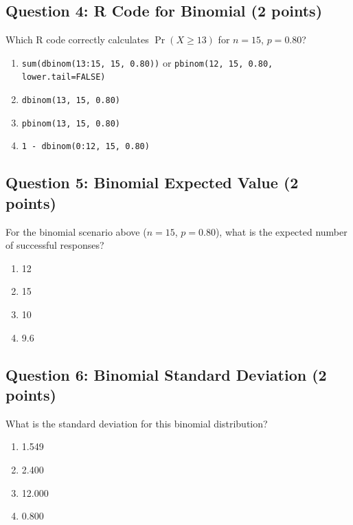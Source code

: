 \documentclass[11pt]{article}
\begin{document}
\vspace{0.5cm}

\subsection*{Question 4: R Code for Binomial (2 points)}

Which R code correctly calculates $\Pr(X \geq 13)$ for $n=15$, $p=0.80$?

\begin{enumerate}[label=\Alph*)]
\item \texttt{sum(dbinom(13:15, 15, 0.80))} or \texttt{pbinom(12, 15, 0.80, lower.tail=FALSE)}
\item \texttt{dbinom(13, 15, 0.80)}
\item \texttt{pbinom(13, 15, 0.80)}
\item \texttt{1 - dbinom(0:12, 15, 0.80)}
\end{enumerate}

\vspace{0.5cm}

\subsection*{Question 5: Binomial Expected Value (2 points)}

For the binomial scenario above ($n=15$, $p=0.80$), what is the expected number of successful responses?

\begin{enumerate}[label=\Alph*)]
\item 12
\item 15
\item 10
\item 9.6
\end{enumerate}

\vspace{0.5cm}

\subsection*{Question 6: Binomial Standard Deviation (2 points)}

What is the standard deviation for this binomial distribution?

\begin{enumerate}[label=\Alph*)]
\item 1.549
\item 2.400
\item 12.000
\item 0.800
\end{enumerate}
\end{document}
